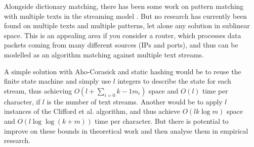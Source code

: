 \documentclass[ %
                    author={Dominic Joseph Moylett},
                    degree={MEng},
                     title={Dictionary Matching with Fingerprints},
                  subtitle={An Empirical Analysis},
                      type={research},
                      year={2015} ]{dissertation}
\begin{document}
Alongside dictionary matching, there has been some work on pattern matching with multiple texts in the streaming model \cite{DBLP:journals/corr/abs-1202-3470}. But no research has currently been found on multiple texts and multiple patterns, let alone any solution in sublinear space. This is an appealing area if you consider a router, which processes data packets coming from many different sources (IPs and ports), and thus can be modelled as an algorithm matching against multiple text streams.

A simple solution with Aho-Corasick and static hashing would be to reuse the finite state machine and simply use $l$ integers to describe the state for each stream, thus achieving $O(l + \sum_{i = 0}{k - 1}m_i)$ space and $O(l)$ time per character, if $l$ is the number of text streams. Another would be to apply $l$ instances of the Clifford et al. algorithm, and thus achieve $O(lk\log m)$ space and $O(l\log\log(k + m))$ time per character. But there is potential to improve on these bounds in theoretical work and then analyse them in empirical research.


%
%

\backmatter





\appendix

\end{document}
